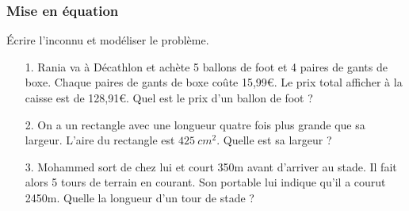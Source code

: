 \subsubsection*{Mise en équation}

Écrire l'inconnu et modéliser le problème. 

\begin{enumerate}
  \item[1.] Rania va à Décathlon et achète 5 ballons de foot et 4 paires de gants de boxe. Chaque paires de gants de boxe coûte 15,99€. Le prix total afficher à la caisse est de 128,91€. Quel est le prix d'un ballon de foot ?

  \item[2.] On a un rectangle avec une longueur quatre fois plus grande que sa largeur. L'aire du rectangle est $\SI{425}{cm^2}$. Quelle est sa largeur ?

  \item[3.] Mohammed sort de chez lui et court 350m avant d'arriver au stade. Il fait alors 5 tours de terrain en courant. Son portable lui indique qu'il a courut 2450m. Quelle la longueur d'un tour de stade ?
\end{enumerate}


